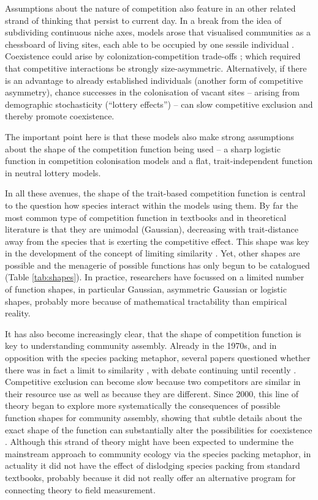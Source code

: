 \documentclass[a4paper,11pt]{article}
\begin{document}
Assumptions about the nature of competition also feature in an other
related strand of thinking that persist to current day. In
a break from the idea of subdividing continuous
niche axes, models arose
that visualised communities as a chessboard of living sites, each able to be
occupied by one sessile individual \citep{Yodzis-1978}. Coexistence could
arise by colonization-competition trade-offs \citep{Levins-1971,
Geritz-1999, Calcagno-2006}; which required that competitive interactions
be strongly size-asymmetric. Alternatively, if there is an advantage to
already established individuals (another form of competitive asymmetry),
chance successes in the colonisation of vacant sites  -- arising from
demographic stochasticity
(``lottery effects'') \citep{Sale-1977, Hubbell-2001} -- can slow
competitive exclusion and thereby promote coexistence.

%
The important point here is that these models also make strong assumptions
about the shape of the competition function being used -- a sharp
logistic function in competition colonisation models and a
flat, trait-independent function in neutral lottery models.

In all these avenues, the shape of the trait-based competition function
is central to the question how
species interact within the models using them.
%
By far the most common type of competition function in textbooks and in
theoretical literature is that they are unimodal (Gaussian),
decreasing with trait-distance away from the species that is exerting
the competitive effect. This shape was key in the development of
the concept of limiting similarity \citep{MacArthur-1967}.
Yet, other shapes are possible  and the menagerie of possible
functions has only begun to be catalogued \citep{Barabas-2012,Leimar-2013}
(Table \ref{tab:shapes}). In practice, researchers have focussed on
a limited number of function shapes, in particular Gaussian,
asymmetric Gaussian or logistic shapes, probably more because of
mathematical tractability than empirical reality.

It has also become increasingly clear, that the shape of competition
function is key to understanding community assembly. Already in the
1970s, and in opposition with the species packing metaphor, several papers
questioned whether there was in fact a limit to similarity
\citep{May-1972, Abrams-1975, Abrams-1983}, with debate continuing
until recently \citep{Meszena-2006, Barabas-2012, Leimar-2013}.
Competitive exclusion can become slow because two
competitors are similar in their resource use as well as because they
are different. Since 2000, this line of theory began to explore more
systematically the consequences of possible function shapes for
community assembly, showing that subtle details about the exact shape of the
function can substantially alter the possibilities for coexistence
\citep{Calcagno-2006, Scheffer-2006, Pigolotti-2007,
 Barabas-2012,Barabas-2013,DAndrea-2013,Leimar-2013}.
Although this strand of theory might have been expected to undermine
the mainstream approach to community ecology via the species packing
metaphor, in actuality it did not have the effect of dislodging
species packing from standard textbooks, probably because it did not
really offer an alternative program for connecting theory to field
measurement.
\end{document}

